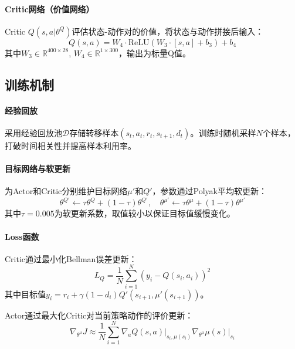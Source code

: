 \documentclass[UTF8,a4paper,12pt]{ctexart}
\begin{document}
\paragraph{Critic网络（价值网络）}
Critic $Q(s,a|\theta^Q)$评估状态-动作对的价值，将状态与动作拼接后输入：
\begin{equation}
Q(s,a) = W_4 \cdot \text{ReLU}(W_3 \cdot [s, a] + b_3) + b_4
\end{equation}
其中$W_3 \in \mathbb{R}^{400 \times 28}$, $W_4 \in \mathbb{R}^{1 \times 300}$，输出为标量Q值。

\subsection{训练机制}

\paragraph{经验回放}
采用经验回放池$\mathcal{D}$存储转移样本$(s_t, a_t, r_t, s_{t+1}, d_t)$。训练时随机采样$N$个样本，打破时间相关性并提高样本利用率。

\paragraph{目标网络与软更新}
为Actor和Critic分别维护目标网络$\mu'$和$Q'$，参数通过Polyak平均软更新：
\begin{equation}
\theta^{Q'} \leftarrow \tau \theta^Q + (1-\tau)\theta^{Q'}, \quad
\theta^{\mu'} \leftarrow \tau \theta^\mu + (1-\tau)\theta^{\mu'}
\end{equation}
其中$\tau = 0.005$为软更新系数，取值较小以保证目标值缓慢变化。

\paragraph{Loss函数}

Critic通过最小化Bellman误差更新：
\begin{equation}
L_Q = \frac{1}{N}\sum_{i=1}^{N}\left(y_i - Q(s_i, a_i)\right)^2
\end{equation}
其中目标值$y_i = r_i + \gamma (1-d_i) Q'(s_{i+1}, \mu'(s_{i+1}))$。

Actor通过最大化Critic对当前策略动作的评价更新：
\begin{equation}
\nabla_{\theta^\mu} J \approx \frac{1}{N}\sum_{i=1}^{N}
\nabla_a Q(s,a)\big|_{s_i, \mu(s_i)}
\nabla_{\theta^\mu} \mu(s)\big|_{s_i}
\end{equation}
\end{document}
